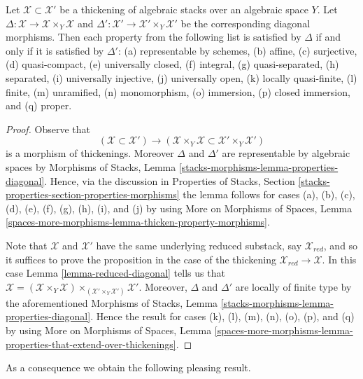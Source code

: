 \begin{lemma}
\label{lemma-thickening-diagonals}
Let $\mathcal{X} \subset \mathcal{X}'$ be a thickening of algebraic stacks
over an algebraic space $Y$.
Let $\Delta: \mathcal{X} \to \mathcal{X} \times_Y \mathcal{X}$ and
$\Delta': \mathcal{X}' \to \mathcal{X}' \times_Y \mathcal{X}'$
be the corresponding diagonal morphisms.
Then each property from the following list is satisfied by $\Delta$ if
and only if it is satisfied by $\Delta'$:
(a) representable by schemes, (b) affine, (c) surjective, (d) quasi-compact,
(e) universally closed, (f) integral, (g) quasi-separated, (h) separated,
(i) universally injective, (j) universally open, (k) locally quasi-finite,
(l) finite, (m) unramified, (n) monomorphism, (o) immersion,
(p) closed immersion, and (q) proper.
\end{lemma}

\begin{proof}
Observe that
$$
(\mathcal{X} \subset \mathcal{X}')
\longrightarrow
(\mathcal{X} \times_Y \mathcal{X} \subset \mathcal{X}' \times_Y \mathcal{X}')
$$
is a morphism of thickenings. Moreover $\Delta$ and $\Delta'$ are
representable by algebraic spaces by
Morphisms of Stacks, Lemma \ref{stacks-morphisms-lemma-properties-diagonal}.
Hence, via the discussion in
Properties of Stacks, Section
\ref{stacks-properties-section-properties-morphisms}
the lemma follows for cases (a), (b), (c), (d),
(e), (f), (g), (h), (i), and (j) by using
More on Morphisms of Spaces, Lemma
\ref{spaces-more-morphisms-lemma-thicken-property-morphisms}.

\medskip\noindent
Note that $\mathcal{X}$ and $\mathcal{X}'$ have the same underlying reduced
substack, say $\mathcal{X}_{red}$, and so it suffices to prove the proposition
in the case of the thickening $\mathcal{X}_{red} \to \mathcal{X}$.
In this case Lemma \ref{lemma-reduced-diagonal} tells us that
$\mathcal{X} = (\mathcal{X} \times_Y \mathcal{X})
\times_{(\mathcal{X}' \times_Y \mathcal{X}')} \mathcal{X}'$.
Moreover, $\Delta$ and $\Delta'$ are locally of finite type by
the aforementioned
Morphisms of Stacks, Lemma \ref{stacks-morphisms-lemma-properties-diagonal}.
Hence the result for cases (k), (l), (m), (n), (o), (p), and (q) by using
More on Morphisms of Spaces, Lemma
\ref{spaces-more-morphisms-lemma-properties-that-extend-over-thickenings}.
\end{proof}

\noindent
As a consequence we obtain the following pleasing result.

